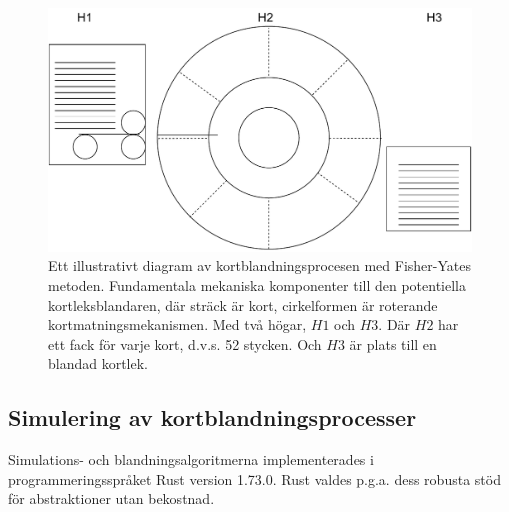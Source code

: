 \documentclass[swedish,a4paper]{article}
\begin{document}
\begin{figure}[H]
	\centering
	\includegraphics[width=0.6\linewidth]{irl_wheel_shuffle.pdf}
	\captionsetup{width=0.6\textwidth} \caption{Ett illustrativt diagram av
		kortblandningsprocesen med 
	Fisher-Yates metoden. Fundamentala mekaniska komponenter till den potentiella
	kortleksblandaren, där sträck är kort, cirkelformen är roterande
kortmatningsmekanismen. Med två högar, $H1$ och $H3$. Där $H2$ har ett fack för
varje kort, d.v.s. 52 stycken. Och $H3$ är plats till en blandad kortlek.}
	\label{fig:irl_wheel}
\end{figure}


\subsection{Simulering av kortblandningsprocesser}
\label{sec:sim_kort}
Simulations- och blandningsalgoritmerna implementerades i programmeringsspråket
Rust version 1.73.0. Rust valdes p.g.a. dess robusta stöd för abstraktioner utan bekostnad.  

% 


\end{document}
